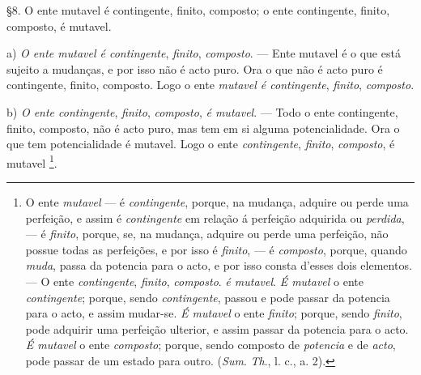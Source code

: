 §8. O ente mutavel é contingente, finito, composto; o ente contingente, finito, composto, é mutavel.

a) \emph{O ente mutavel é contingente}, \emph{finito}, \emph{composto}. --- Ente mutavel é o que está sujeito a mudanças, e por isso não é acto puro. Ora o que não é acto puro é contingente, finito, composto. Logo o ente \emph{mutavel é contingente}, \emph{finito}, \emph{composto}.

b) \emph{O ente contingente}, \emph{finito}, \emph{composto}, \emph{é mutavel}. --- Todo o ente contingente, finito, composto, não é acto puro, mas tem em si alguma potencialidade. Ora o que tem potencialidade é mutavel. Logo o ente \emph{contingente}, \emph{finito}, \emph{composto}, é mutavel \footnote{O ente \emph{mutavel} --- é \emph{contingente}, porque, na mudança, adquire ou perde uma perfeição, e assim é \emph{contingente} em relação á perfeição adquirida ou \emph{perdida}, --- é \emph{finito}, porque, se, na mudança, adquire ou perde uma perfeição, não possue todas as perfeições, e por isso é \emph{finito}, --- é \emph{composto}, porque, quando \emph{muda}, passa da potencia para o acto, e por isso consta d'esses dois elementos. --- O ente \emph{contingente}, \emph{finito}, \emph{composto}. \emph{é mutavel}. \emph{É mutavel} o ente \emph{contingente}; porque, sendo \emph{contingente}, passou e pode passar da potencia para o acto, e assim mudar-se. \emph{É mutavel} o ente \emph{finito}; porque, sendo \emph{finito}, pode adquirir uma perfeição ulterior, e assim passar da potencia para o acto. \emph{É mutavel} o ente \emph{composto}; porque, sendo composto de \emph{potencia} e de \emph{acto}, pode passar de um estado para outro. (\emph{Sum}. \emph{Th}., l. c., a. 2).}.

